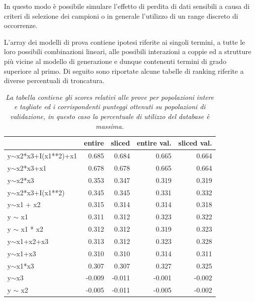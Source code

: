 \documentclass[a4paper]{report}
\begin{document}
In questo modo è possibile simulare l'effetto di perdita di dati sensibili a causa di criteri di selezione dei campioni o in generale l'utilizzo di un range discreto di occorrenze.

L'array dei modelli di prova contiene ipotesi riferite ai singoli termini, a tutte le loro possibili combinazioni lineari, alle possibili interazioni a coppie ed a strutture più vicine al modello di generazione e dunque contenenti termini di grado superiore al primo.
Di seguito sono riportate alcune tabelle di ranking riferite a diverse percentuali di troncatura.

\begin{table}[h!btp]
\begin{tabular}{lrrrr}
\toprule
{} &  entire &  sliced &  entire val. &  sliced val. \\
\midrule
y$\sim$x2*x3+I(x1**2)+x1 &         0.685 &         0.684 &             0.665 &             0.664 \\
y$\sim$x2*x3+x1          &         0.678 &         0.678 &             0.665 &             0.664 \\
y$\sim$x2*x3             &         0.353 &         0.347 &             0.319 &             0.319 \\
y$\sim$x2*x3+I(x1**2)    &         0.345 &         0.345 &             0.331 &             0.332 \\
y$\sim$x1 + x2           &         0.315 &         0.314 &             0.314 &             0.318 \\
y $\sim$ x1              &         0.311 &         0.312 &             0.323 &             0.322 \\
y $\sim$ x1 * x2         &         0.312 &         0.312 &             0.319 &             0.323 \\
y$\sim$x1+x2+x3          &         0.313 &         0.312 &             0.323 &             0.328 \\
y$\sim$x1+x3             &         0.310 &         0.310 &             0.314 &             0.311 \\
y$\sim$x1*x3             &         0.307 &         0.307 &             0.327 &             0.325 \\
y$\sim$x3                &        -0.009 &        -0.011 &            -0.001 &            -0.002 \\
y $\sim$ x2              &        -0.005 &        -0.011 &            -0.005 &            -0.002 \\
\bottomrule
\end{tabular}
\caption{\textit{La tabella contiene gli scores relativi alle prove per popolazioni intere e tagliate ed i corrispondenti punteggi  ottenuti su popolazioni di validazione, in questo caso la percentuale di utilizzo del database è massima.}}
\end{table}
\end{document}
